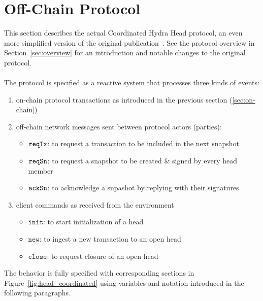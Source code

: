 \section{Off-Chain Protocol}\label{sec:offchain}

This section describes the actual Coordinated Hydra Head protocol, an even more simplified version of the original publication~\cite{hydrahead20}. See the protocol overview in Section~\ref{sec:overview} for an introduction and notable changes to the original protocol.\\
\\
The protocol is specified as a reactive system that processes three kinds of events:
\begin{enumerate}
  \item on-chain protocol transactions as introduced in the previous section (\ref{sec:on-chain})
  \item off-chain network messages sent between protocol actors (parties):
    \begin{itemize}
      \item $\mathtt{reqTx}$: to request a transaction to be included in the next snapshot
      \item $\mathtt{reqSn}$: to request a snapshot to be created \& signed by every head member
      \item $\mathtt{ackSn}$: to acknowledge a snpashot by replying with their signatures
    \end{itemize}
  \item client commands as received from the environment
    \begin{itemize}
      \item $\mathtt{init}$: to start initialization of a head
      \item $\mathtt{new}$: to ingest a new transaction to an open head
      \item $\mathtt{close}$: to request closure of an open head
    \end{itemize}
\end{enumerate}

The behavior is fully specified with corresponding sections in
Figure~\ref{fig:head_coordinated} using variables and notation introduced in the
following paragraphs.

